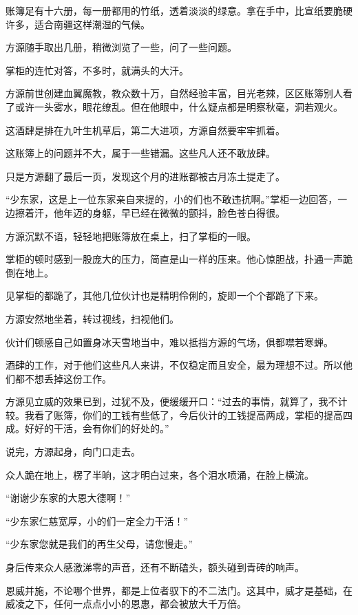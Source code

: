 \begin{this_body}
账簿足有十六册，每一册都用的竹纸，透着淡淡的绿意。拿在手中，比宣纸要脆硬许多，适合南疆这样潮湿的气候。

方源随手取出几册，稍微浏览了一些，问了一些问题。

掌柜的连忙对答，不多时，就满头的大汗。

方源前世创建血翼魔教，教众数十万，自然经验丰富，目光老辣，区区账簿别人看了或许一头雾水，眼花缭乱。但在他眼中，什么疑点都是明察秋毫，洞若观火。

这酒肆是排在九叶生机草后，第二大进项，方源自然要牢牢抓着。

这账簿上的问题并不大，属于一些错漏。这些凡人还不敢放肆。

只是方源翻了最后一页，发现这个月的进账都被古月冻土提走了。

“少东家，这是上一位东家亲自来提的，小的们也不敢违抗啊。”掌柜一边回答，一边擦着汗，他年迈的身躯，早已经在微微的颤抖，脸色苍白得很。

方源沉默不语，轻轻地把账簿放在桌上，扫了掌柜的一眼。

掌柜的顿时感到一股庞大的压力，简直是山一样的压来。他心惊胆战，扑通一声跪倒在地上。

见掌柜的都跪了，其他几位伙计也是精明伶俐的，旋即一个个都跪了下来。

方源安然地坐着，转过视线，扫视他们。

伙计们顿感自己如置身冰天雪地当中，难以抵挡方源的气场，俱都噤若寒蝉。

酒肆的工作，对于他们这些凡人来讲，不仅稳定而且安全，最为理想不过。所以他们都不想丢掉这份工作。

方源见立威的效果已到，过犹不及，便缓缓开口：“过去的事情，就算了，我不计较。我看了账簿，你们的工钱有些低了，今后伙计的工钱提高两成，掌柜的提高四成。好好的干活，会有你们的好处的。”

说完，方源起身，向门口走去。

众人跪在地上，楞了半晌，这才明白过来，各个泪水喷涌，在脸上横流。

“谢谢少东家的大恩大德啊！”

“少东家仁慈宽厚，小的们一定全力干活！”

“少东家您就是我们的再生父母，请您慢走。”

身后传来众人感激涕零的声音，还有不断磕头，额头碰到青砖的响声。

恩威并施，不论哪个世界，都是上位者驭下的不二法门。这其中，威才是基础，在威凌之下，任何一点点小小的恩惠，都会被放大千万倍。


\end{this_body}
